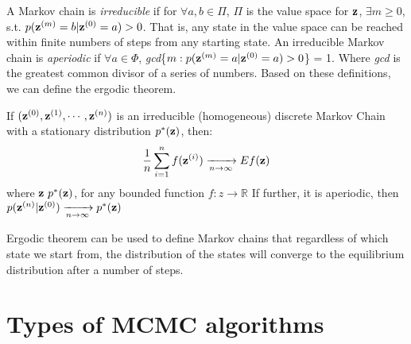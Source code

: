A Markov chain is {\it irreducible} if for $\forall a, b\in \Pi$, $\Pi$ is the value space for ${\bf z}$, $\exists m\geq 0$, s.t. $p({\bf z}^{(m)}=b|{\bf z}^{(0)}=a)>0$. That is, any state in the value space can be reached within
finite numbers of steps from any starting state. An irreducible Markov chain is {\it aperiodic} if $\forall a \in \Phi$, {\it gcd}\{$m:p({\bf z}^{(m)}=a|{\bf z}^{(0)}=a)>0$\} = 1. Where {\it gcd} is the greatest common divisor of a series of numbers.
Based on these definitions, we can define the ergodic theorem.
\begin{theorem}
If $({\bf z}^{(0)},{\bf z}^{(1)},\cdots,{\bf z}^{(n)})$ is an irreducible (homogeneous) discrete Markov Chain with a stationary
distribution $p^{*}({\bf z})$, then: 
$$\frac{1}{n}\sum_{i=1}^{n}f({\bf z}^{(i)}) \xrightarrow[n\rightarrow \infty]{} Ef({\bf z})$$ 
where ${\bf z}~ p^{*}({\bf z})$,
for any bounded function $f:z\rightarrow \mathbb{R}$ 
If further, it is aperiodic, then $p({\bf z}^{(n)}|{\bf z}^{(0)})\xrightarrow[n\rightarrow \infty]{} p^{*}({\bf z})$
\end{theorem}
Ergodic theorem can be used to define Markov chains that regardless of which state we start from, the distribution of the states will converge to the equilibrium distribution after
a number of steps.

\section{Types of MCMC algorithms}

